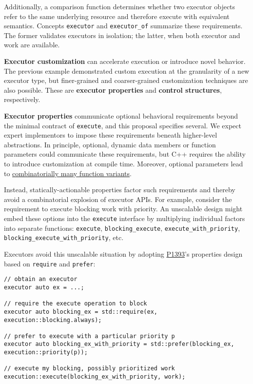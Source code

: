 \documentclass[a4paper,12pt,notitlepage,twoside,openright]{article}
\begin{document}
Additionally, a comparison function determines whether two executor
objects refer to the same underlying resource and therefore execute with
equivalent semantics. Concepts \texttt{executor} and
\texttt{executor_of} summarize these requirements. The
former validates executors in isolation; the latter, when both executor
and work are available.

\textbf{Executor customization} can accelerate execution or introduce
novel behavior. The previous example demonstrated custom execution at
the granularity of a new executor type, but finer-grained and
coarser-grained customization techniques are also possible. These are
\textbf{executor properties} and \textbf{control structures},
respectively.

\textbf{Executor properties} communicate optional behavioral
requirements beyond the minimal contract of
\texttt{execute}, and this proposal specifies several. We
expect expert implementors to impose these requirements beneath
higher-level abstractions. In principle, optional, dynamic data members
or function parameters could communicate these requirements, but C++
requires the ability to introduce customization at compile time.
Moreover, optional parameters lead to
\href{https://wg21.link/P2033}{combinatorially many function variants}.

Instead, statically-actionable properties factor such requirements and
thereby avoid a combinatorial explosion of executor APIs. For example,
consider the requirement to execute blocking work with priority. An
unscalable design might embed these options into the
\texttt{execute} interface by multiplying individual factors
into separate functions: \texttt{execute},
\texttt{blocking_execute},
\texttt{execute_with_priority},
\texttt{blocking_execute_with_priority}, etc.

Executors avoid this unscalable situation by adopting
\href{https://wg21.link/P1393}{P1393}'s properties design based on
\texttt{require} and \texttt{prefer}:

\begin{verbatim}
// obtain an executor
executor auto ex = ...;

// require the execute operation to block
executor auto blocking_ex = std::require(ex, execution::blocking.always);

// prefer to execute with a particular priority p
executor auto blocking_ex_with_priority = std::prefer(blocking_ex, execution::priority(p));

// execute my blocking, possibly prioritized work
execution::execute(blocking_ex_with_priority, work);
\end{verbatim}
\end{document}
